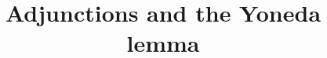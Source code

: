\documentclass{ximera}
\title{Adjunctions and the Yoneda lemma}
\begin{document}
\begin{abstract}

\end{abstract}
\maketitle

\end{document}
